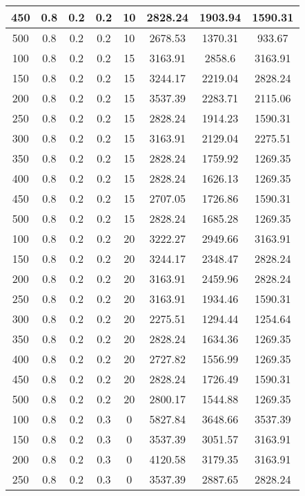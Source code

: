 \documentclass[a4paper, 12pt]{extreport}
\begin{document}
\begin{itemize}
\begin{longtable}{|c|c|c|c|c|c|c|c|}
			450 & 0.8 & 0.2 & 0.2 & 10 & 2828.24 & 1903.94 & 1590.31 \\\hline
			500 & 0.8 & 0.2 & 0.2 & 10 & 2678.53 & 1370.31 & 933.67 \\\hline
			100 & 0.8 & 0.2 & 0.2 & 15 & 3163.91 & 2858.6 & 3163.91 \\\hline
			150 & 0.8 & 0.2 & 0.2 & 15 & 3244.17 & 2219.04 & 2828.24 \\\hline
			200 & 0.8 & 0.2 & 0.2 & 15 & 3537.39 & 2283.71 & 2115.06 \\\hline
			250 & 0.8 & 0.2 & 0.2 & 15 & 2828.24 & 1914.23 & 1590.31 \\\hline
			300 & 0.8 & 0.2 & 0.2 & 15 & 3163.91 & 2129.04 & 2275.51 \\\hline
			350 & 0.8 & 0.2 & 0.2 & 15 & 2828.24 & 1759.92 & 1269.35 \\\hline
			400 & 0.8 & 0.2 & 0.2 & 15 & 2828.24 & 1626.13 & 1269.35 \\\hline
			450 & 0.8 & 0.2 & 0.2 & 15 & 2707.05 & 1726.86 & 1590.31 \\\hline
			500 & 0.8 & 0.2 & 0.2 & 15 & 2828.24 & 1685.28 & 1269.35 \\\hline
			100 & 0.8 & 0.2 & 0.2 & 20 & 3222.27 & 2949.66 & 3163.91 \\\hline
			150 & 0.8 & 0.2 & 0.2 & 20 & 3244.17 & 2348.47 & 2828.24 \\\hline
			200 & 0.8 & 0.2 & 0.2 & 20 & 3163.91 & 2459.96 & 2828.24 \\\hline
			250 & 0.8 & 0.2 & 0.2 & 20 & 3163.91 & 1934.46 & 1590.31 \\\hline
			300 & 0.8 & 0.2 & 0.2 & 20 & 2275.51 & 1294.44 & 1254.64 \\\hline
			350 & 0.8 & 0.2 & 0.2 & 20 & 2828.24 & 1634.36 & 1269.35 \\\hline
			400 & 0.8 & 0.2 & 0.2 & 20 & 2727.82 & 1556.99 & 1269.35 \\\hline
			450 & 0.8 & 0.2 & 0.2 & 20 & 2828.24 & 1726.49 & 1590.31 \\\hline
			500 & 0.8 & 0.2 & 0.2 & 20 & 2800.17 & 1544.88 & 1269.35 \\\hline
			100 & 0.8 & 0.2 & 0.3 & 0 & 5827.84 & 3648.66 & 3537.39 \\\hline
			150 & 0.8 & 0.2 & 0.3 & 0 & 3537.39 & 3051.57 & 3163.91 \\\hline
			200 & 0.8 & 0.2 & 0.3 & 0 & 4120.58 & 3179.35 & 3163.91 \\\hline
			250 & 0.8 & 0.2 & 0.3 & 0 & 3537.39 & 2887.65 & 2828.24 \\\hline

\end{longtable}
\end{itemize}
\end{document}
